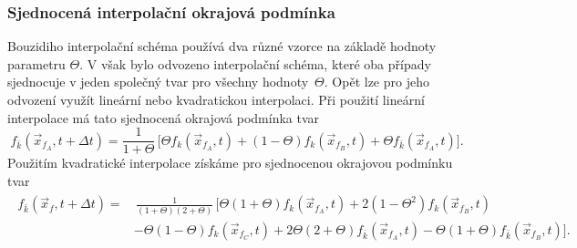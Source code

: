 \subsubsection{\fontsize{12}{15}\selectfont Sjednocená interpolační okrajová podmínka}
Bouzidiho interpolační schéma používá dva různé vzorce na základě hodnoty parametru $ \Theta $. V \cite{Yu2003} však bylo odvozeno interpolační schéma, které oba případy sjednocuje v jeden společný tvar pro všechny hodnoty~$ \Theta $. Opět lze pro jeho odvození využít lineární nebo kvadratickou interpolaci.
Při použití lineární interpolace má tato sjednocená okrajová podmínka tvar
\begin{equation}\label{eq:luni}
f_{\bar{k}}\left(\vec{x}_{f{_A}}, t+\Delta t\right)= \frac{1}{1+\Theta} \, \Big[ \Theta f_{k}\left(\vec{x}_{f{_A}}, t\right)+(1-\Theta) {f}_{k}\left(\vec{x}_{f{_B}}, t\right) +\Theta {f}_{\bar{k}}\left(\vec{x}_{f{_A}}, t\right) \Big].
\end{equation}
Použitím kvadratické interpolace získáme pro sjednocenou okrajovou podmínku tvar
\begin{align}\label{eq:quni}
\begin{split}
f_{\bar{k}}\left(\vec{x}_{f}, t+\Delta t\right)=& \,
\frac{1}{(1+\Theta)(2+\Theta)} \, \Big[\Theta(1+\Theta) {f}_{k}\left(\vec{x}_{f{_A}}, t\right)+2\left(1-\Theta^{2}\right) {f}_{k}\left(\vec{x}_{f{_B}}, t\right)
\\&-\Theta(1-\Theta) {f}_{k}\left(\vec{x}_{f{_C}}, t\right)+2 \Theta(2+\Theta) {f}_{\bar{k}}\left(\vec{x}_{f{_A}}, t\right) 
-\Theta(1+\Theta) {f}_{\bar{k}}\left(\vec{x}_{f{_B}}, t\right) \Big].
\end{split}\end{align}
